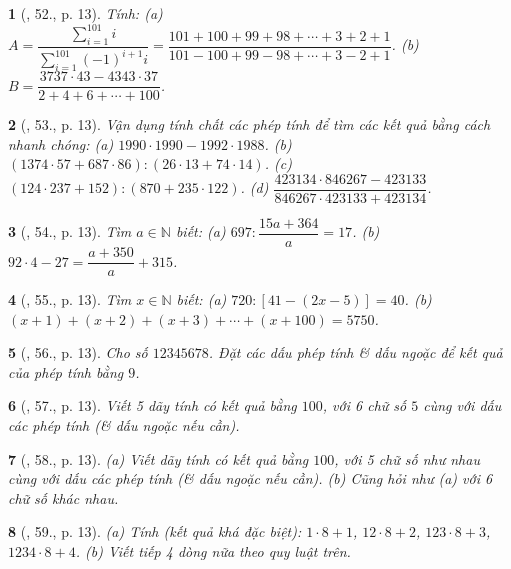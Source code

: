 \documentclass{article}
\newtheorem{baitoan}{}
\begin{document}
\begin{baitoan}[\cite{Binh_Toan_6_tap_1}, 52., p. 13]
	Tính: (a) $A = \dfrac{\sum_{i=1}^{101} i}{\sum_{i=1}^{101} (-1)^{i+1}i} = \dfrac{101 + 100 + 99 + 98 + \cdots + 3 + 2 + 1}{101 - 100 + 99 - 98 + \cdots + 3 - 2 + 1}$. (b) $B = \dfrac{3737\cdot43 - 4343\cdot37}{2 + 4 + 6 + \cdots + 100}$.
\end{baitoan}

\begin{baitoan}[\cite{Binh_Toan_6_tap_1}, 53., p. 13]
	Vận dụng tính chất các phép tính để tìm các kết quả bằng cách nhanh chóng: (a) $1990\cdot1990 - 1992\cdot1988$. (b) $(1374\cdot57 + 687\cdot86):(26\cdot13 + 74\cdot14)$. (c) $(124\cdot237 + 152):(870 + 235\cdot122)$. (d) $\dfrac{423134\cdot846267 - 423133}{846267\cdot423133 + 423134}$.
\end{baitoan}

\begin{baitoan}[\cite{Binh_Toan_6_tap_1}, 54., p. 13]
	Tìm $a\in\mathbb{N}$ biết: (a) $697:\dfrac{15a + 364}{a} = 17$. (b) $92\cdot4 - 27 = \dfrac{a + 350}{a} + 315$.
\end{baitoan}

\begin{baitoan}[\cite{Binh_Toan_6_tap_1}, 55., p. 13]
	Tìm $x\in\mathbb{N}$ biết: (a) $720:[41 - (2x - 5)] = 40$. (b) $(x + 1) + (x + 2) + (x + 3) + \cdots + (x + 100) = 5750$.
\end{baitoan}

\begin{baitoan}[\cite{Binh_Toan_6_tap_1}, 56., p. 13]
	Cho số $12345678$. Đặt các dấu phép tính \& dấu ngoặc để kết quả của phép tính bằng $9$.
\end{baitoan}

\begin{baitoan}[\cite{Binh_Toan_6_tap_1}, 57., p. 13]
	Viết 5 dãy tính có kết quả bằng $100$, với 6 chữ số $5$ cùng với dấu các phép tính (\& dấu ngoặc nếu cần).
\end{baitoan}

\begin{baitoan}[\cite{Binh_Toan_6_tap_1}, 58., p. 13]
	(a) Viết dãy tính có kết quả bằng $100$, với 5 chữ số như nhau cùng với dấu các phép tính (\& dấu ngoặc nếu cần). (b) Cũng hỏi như (a) với 6 chữ số khác nhau.
\end{baitoan}

\begin{baitoan}[\cite{Binh_Toan_6_tap_1}, 59., p. 13]
	(a) Tính (kết quả khá đặc biệt): $1\cdot8 + 1$, $12\cdot8 + 2$, $123\cdot8 + 3$, $1234\cdot8 + 4$. (b) Viết tiếp 4 dòng nữa theo quy luật trên.
\end{baitoan}
\end{document}
